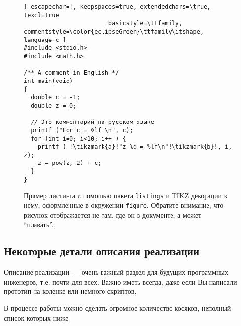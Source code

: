 \begin{figure}
    \begin{lstlisting}[ escapechar=!, keepspaces=true, extendedchars=\true, texcl=true
                      , basicstyle=\ttfamily, commentstyle=\color{eclipseGreen}\ttfamily\itshape, language=c ]
#include <stdio.h>
#include <math.h>

/** A comment in English */
int main(void)
{
  double c = -1;
  double z = 0;

  // Это комментарий на русском языке
  printf ("For c = %lf:\n", c);
  for (int i=0; i<10; i++ ) {
    printf ( !\tikzmark{a}!"z %d = %lf\n"!\tikzmark{b}!, i, z);
    z = pow(z, 2) + c;
  }
}
\end{lstlisting}

    \caption{Пример листинга c помощью пакета \texttt{listings} и \textsc{TIKZ} декорации к нему, оформленные в окружении \texttt{figure}.
        Обратите внимание, что рисунок отображается не там, где он в документе, а может \enquote{плавать}.}
\end{figure}

\subsection{Некоторые детали описания реализации}
Описание реализации~--- очень важный раздел для будущих программных инженеров, т.е. почти для всех.
Важно иметь всегда, даже если Вы написали прототип на коленке или немного скриптов.

В процессе работы можно сделать огромное количество косяков, неполный список которых ниже.

